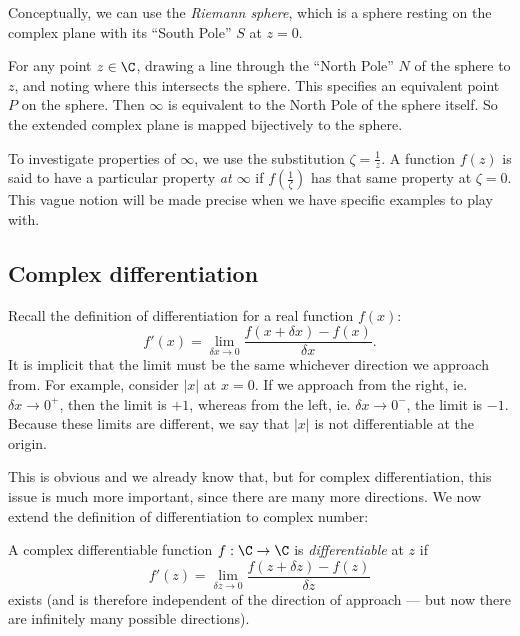 \documentclass[a4paper]{article}
\begin{document}
Conceptually, we can use the \emph{Riemann sphere}, which is a sphere resting on the complex plane with its ``South Pole'' $S$ at $z = 0$.
\begin{center}
\end{center}
For any point $z \in \C$, drawing a line through the ``North Pole'' $N$ of the sphere to $z$, and noting where this intersects the sphere. This specifies an equivalent point $P$ on the sphere. Then $\infty$ is equivalent to the North Pole of the sphere itself. So the extended complex plane is mapped bijectively to the sphere.

To investigate properties of $\infty$, we use the substitution $\zeta = \frac{1}{z}$. A function $f(z)$ is said to have a particular property \emph{at $\infty$} if $f(\frac{1}{\zeta})$ has that same property at $\zeta = 0$. This vague notion will be made precise when we have specific examples to play with.

\subsection{Complex differentiation}
Recall the definition of differentiation for a real function $f(x)$:
\[
  f'(x) = \lim_{\delta x \to 0} \frac{f(x + \delta x) - f(x)}{\delta x}.
\]
It is implicit that the limit must be the same whichever direction we approach from. For example, consider $|x|$ at $x = 0$. If we approach from the right, ie. $\delta x \to 0^+$, then the limit is $+1$, whereas from the left, ie. $\delta x \to 0^-$, the limit is $-1$. Because these limits are different, we say that $|x|$ is not differentiable at the origin.

This is obvious and we already know that, but for complex differentiation, this issue is much more important, since there are many more directions. We now extend the definition of differentiation to complex number:
\begin{defi}
  A complex differentiable function $f: \C \to \C$ is \emph{differentiable} at $z$ if
  \[
    f'(z) = \lim_{\delta z \to 0} \frac{f(z + \delta z) - f(z)}{\delta z}
  \]
  exists (and is therefore independent of the direction of approach --- but now there are infinitely many possible directions).
\end{defi}
\end{document}
